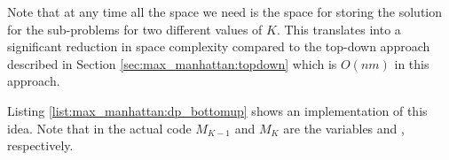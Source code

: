 Note that at any time all the space we need is the space for storing the solution for the
sub-problems for two different values of $K$. This translates into a significant reduction in  space
complexity compared to the top-down approach described in Section \ref{sec:max_manhattan:topdown} which
is $O(nm)$ in this approach. 

Listing \ref{list:max_manhattan:dp_bottomup} shows an implementation of this idea. Note that in
the actual code $M_{K-1}$ and $M_{K}$ are the variables  and ,
respectively. 


